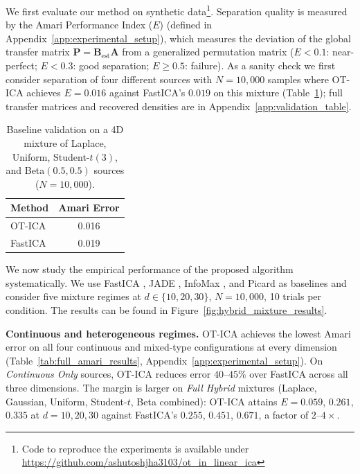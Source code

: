 \documentclass[accepted]{tpm2026} %
\begin{document}
We first evaluate our method on synthetic data\footnote{Code to reproduce the experiments is available under \url{https://github.com/ashutoshjha3103/ot_in_linear_ica}}.
Separation quality is measured by the Amari Performance Index ($E$) \citep{amari1996new} (defined in Appendix~\ref{app:experimental_setup}), 
which measures the deviation of the global transfer matrix $\mathbf{P} = \mathbf{B}_{\text{est}}\mathbf{A}$ from a 
generalized permutation matrix ($E < 0.1$: near-perfect; $E < 0.3$: good separation; $E \ge 0.5$: failure).
As a sanity check we first consider separation of four different sources with $N=10,000$ samples
where OT-ICA achieves $E = 0.016$ against FastICA's $0.019$ on this mixture (Table~\ref{tab:baseline_sanity});
full transfer matrices and recovered densities are in Appendix~\ref{app:validation_table}.

\begin{table}[!tb]
\centering
\small
\begin{tabular}{lc}
\toprule
\textbf{Method} & \textbf{Amari Error} \\
\midrule
OT-ICA & 0.016 \\
FastICA & 0.019 \\
\bottomrule
\end{tabular}
\caption{Baseline validation on a 4D mixture of Laplace, Uniform, Student-$t(3)$, and Beta$(0.5,0.5)$ sources ($N=10{,}000$).}
\label{tab:baseline_sanity}
\end{table}




We now study the empirical performance of the proposed algorithm systematically.
We use FastICA \citep{hyvarinen2001}, JADE \citep{cardoso1993blind}, InfoMax \citep{bell1995information}, and 
Picard \citep{ablin2018faster} as baselines and consider five mixture regimes at $d \in \{10, 20, 30\}$, $N = 10{,}000$, 10 trials per condition. The results can be found in Figure~\ref{fig:hybrid_mixture_results}.

\textbf{Continuous and heterogeneous regimes.} OT-ICA achieves the lowest Amari error on all four continuous and mixed-type configurations at every 
dimension (Table~\ref{tab:full_amari_results}, Appendix~\ref{app:experimental_setup}). On \textit{Continuous Only} sources, 
OT-ICA reduces error $40$--$45\%$ over FastICA across all three dimensions. The margin is larger on \textit{Full Hybrid} mixtures 
(Laplace, Gaussian, Uniform, Student-$t$, Beta combined): OT-ICA attains $E = 0.059$, $0.261$, $0.335$ at $d = 10, 20, 30$ against 
FastICA's $0.255$, $0.451$, $0.671$, a factor of $2$--$4\times$.
\end{document}

